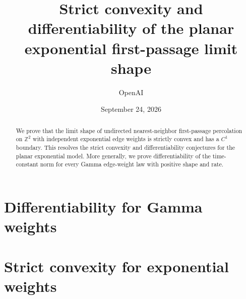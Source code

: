 \documentclass[11pt]{article}
\title{Strict convexity and differentiability of the planar exponential first-passage limit shape}
\author{OpenAI}
\date{September 24, 2026}
\numberwithin{equation}{section}
\theoremstyle{definition}
\theoremstyle{remark}
\newcommand{\Z}{\mathbb Z}
\newcommand{\1}{\mathbf 1}
\begin{document}
\maketitle
\begin{abstract}
We prove that the limit shape of undirected nearest-neighbor
first-passage percolation on $\Z^2$ with independent exponential edge
weights is strictly convex and has a $C^1$ boundary. This resolves the
strict convexity and differentiability conjectures for the planar
exponential model. More generally, we prove differentiability of the
time-constant norm for every Gamma edge-weight law with positive shape
and rate.
\end{abstract}
\clearpage
\tableofcontents
\clearpage

\clearpage
\part{Differentiability for Gamma weights}
\label{part:differentiability}






\clearpage
\part{Strict convexity for exponential weights}
\label{part:strict}











\end{document}
